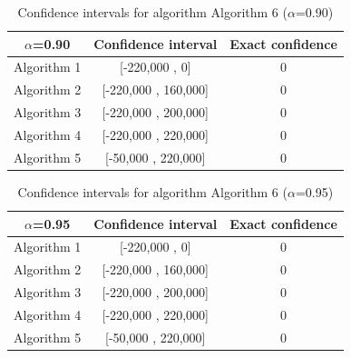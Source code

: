\documentclass[a4paper,10pt]{article}
\begin{document}
\begin{table}[!htp]
\centering\small
\begin{tabular}{
|c|c|c|}
\hline
 $\alpha$=0.90 & Confidence interval & Exact confidence \\ \hline 
Algorithm 1 & [-220,000 , 0] & 0\\ \hline 
Algorithm 2 & [-220,000 , 160,000] & 0\\ \hline 
Algorithm 3 & [-220,000 , 200,000] & 0\\ \hline 
Algorithm 4 & [-220,000 , 220,000] & 0\\ \hline 
Algorithm 5 & [-50,000 , 220,000] & 0\\ \hline 

\end{tabular}
\caption{Confidence intervals for algorithm Algorithm 6 ($\alpha$=0.90)}
\end{table}
\begin{table}[!htp]
\centering\small
\begin{tabular}{
|c|c|c|}
\hline
 $\alpha$=0.95 & Confidence interval & Exact confidence \\ \hline 
Algorithm 1 & [-220,000 , 0] & 0\\ \hline 
Algorithm 2 & [-220,000 , 160,000] & 0\\ \hline 
Algorithm 3 & [-220,000 , 200,000] & 0\\ \hline 
Algorithm 4 & [-220,000 , 220,000] & 0\\ \hline 
Algorithm 5 & [-50,000 , 220,000] & 0\\ \hline 

\end{tabular}
\caption{Confidence intervals for algorithm Algorithm 6 ($\alpha$=0.95)}
\end{table}

 \clearpage 
\end{document}
